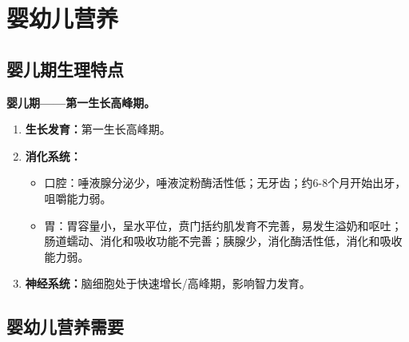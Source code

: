 \section{婴幼儿营养}

\subsection{婴儿期生理特点}

\begin{keybox}
\textbf{婴儿期——第一生长高峰期。}

\begin{enumerate}[leftmargin=*]
    \item \textbf{生长发育：}第一生长高峰期。

    \item \textbf{消化系统：}
    \begin{itemize}[leftmargin=*]
        \item 口腔：唾液腺分泌少，唾液淀粉酶活性低；无牙齿；约6-8个月开始出牙，咀嚼能力弱。
        \item 胃：胃容量小，呈水平位，贲门括约肌发育不完善，易发生溢奶和呕吐；肠道蠕动、消化和吸收功能不完善；胰腺少，消化酶活性低，消化和吸收能力弱。
    \end{itemize}

    \item \textbf{神经系统：}脑细胞处于快速增长/高峰期，影响智力发育。
\end{enumerate}
\end{keybox}

\subsection{婴幼儿营养需要}

